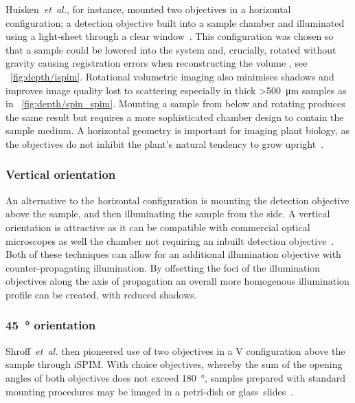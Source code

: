 Huisken~\emph{et~al.}, for instance, mounted two objectives in a horizontal configuration; a detection objective built into a sample chamber and illuminated using a \gls{light-sheet} through a clear window~\cite{huisken_optical_2004}.
This configuration was chosen so that a sample could be lowered into the system and, crucially, rotated without gravity causing registration errors when reconstructing the volume , see \figurename~\ref{fig:depth/ispim}.
Rotational volumetric imaging also minimises shadows and improves image quality lost to scattering especially in thick \SI{>500}{\micro\meter} samples as in \figurename~\ref{fig:depth/spin_spim}.
Mounting a sample from below and rotating produces the same result but requires a more sophisticated chamber design to contain the sample medium.
A horizontal geometry is important for imaging plant biology, as the objectives do not inhibit the plant's natural tendency to grow upright~\cite{wangenheimRulesSelfOrganizingProperties2016a}. %

\subsubsection{Vertical orientation}

An alternative to the horizontal configuration is mounting the detection objective above the sample, and then illuminating the sample from the side.
A vertical orientation is attractive as it can be compatible with commercial optical microscopes as well the chamber not requiring an inbuilt detection objective~\cite{ALEKS 29 30}.
Both of these techniques can allow for an additional illumination objective with counter-propagating illumination.
By offsetting the foci of the illumination objectives along the axis of propagation an overall more homogenous illumination profile can be created, with reduced shadows.

\subsubsection{\SI{45}{\degree} orientation}

Shroff~\emph{et~al.} then pioneered use of two objectives in a V configuration above the sample through \gls{iSPIM}.
With choice objectives, whereby the sum of the opening angles of both objectives does not exceed \SI{180}{\degree},
samples prepared with standard mounting procedures may be imaged in a petri-dish or glass~slides~\cite{kumarDualViewPlaneIllumination2014}.


